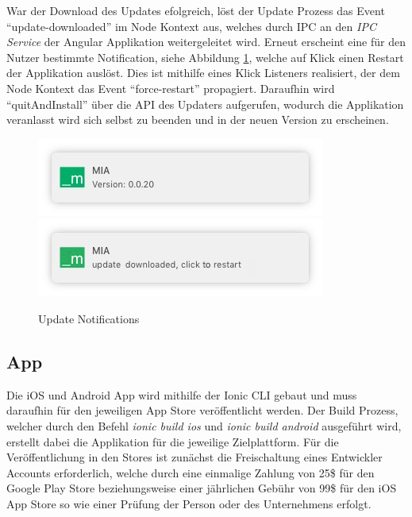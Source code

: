 War der Download des Updates efolgreich, löst der Update Prozess das Event ``update-downloaded'' im Node Kontext aus,
welches durch IPC an den \emph{IPC Service} der Angular Applikation weitergeleitet wird. Erneut erscheint eine für den Nutzer bestimmte Notification, siehe Abbildung \ref{kapitel4/update-push}, welche auf Klick einen Restart der Applikation auslöst.
Dies ist mithilfe eines Klick Listeners realisiert, der dem Node Kontext das Event ``force-restart'' propagiert.
Daraufhin wird ``quitAndInstall'' über die \ac{API} des Updaters aufgerufen, wodurch die Applikation veranlasst wird sich selbst zu beenden und in der neuen Version zu erscheinen.


\begin{figure}[h]
 \centering
  \includegraphics[width=0.5\linewidth]{kapitel4/version-push.jpg}
 \includegraphics[width=0.5\linewidth]{kapitel4/update-push.jpg}
 \caption{Update Notifications}
 \label{kapitel4/update-push}
\end{figure}
\vspace{0.3cm}


\subsection{App}

Die iOS und Android App wird mithilfe der Ionic \ac{CLI} gebaut und muss daraufhin für den
jeweiligen App Store veröffentlicht werden. Der Build Prozess,
welcher durch den Befehl \emph{ionic build ios} und \emph{ionic build android} ausgeführt wird,
erstellt dabei die Applikation für die jeweilige Zielplattform.
Für die Veröffentlichung in den Stores ist zunächst die Freischaltung eines Entwickler Accounts erforderlich,
welche durch eine einmalige Zahlung von 25\$ für den Google Play Store beziehungsweise einer jährlichen Gebühr von 99\$
für den iOS App Store so wie einer Prüfung der Person oder des Unternehmens erfolgt.
